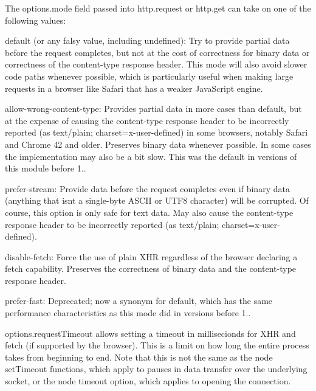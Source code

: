 \begin{DoxyItemize}
\item The {\ttfamily options.\+mode} field passed into {\ttfamily http.\+request} or {\ttfamily http.\+get} can take on one of the following values\+:
\begin{DoxyItemize}
\item \textquotesingle{}default\textquotesingle{} (or any falsy value, including {\ttfamily undefined})\+: Try to provide partial data before the request completes, but not at the cost of correctness for binary data or correctness of the \textquotesingle{}content-\/type\textquotesingle{} response header. This mode will also avoid slower code paths whenever possible, which is particularly useful when making large requests in a browser like Safari that has a weaker Java\+Script engine.
\item \textquotesingle{}allow-\/wrong-\/content-\/type\textquotesingle{}\+: Provides partial data in more cases than \textquotesingle{}default\textquotesingle{}, but at the expense of causing the \textquotesingle{}content-\/type\textquotesingle{} response header to be incorrectly reported (as \textquotesingle{}text/plain; charset=x-\/user-\/defined\textquotesingle{}) in some browsers, notably Safari and Chrome 42 and older. Preserves binary data whenever possible. In some cases the implementation may also be a bit slow. This was the default in versions of this module before 1..
\item \textquotesingle{}prefer-\/stream\textquotesingle{}\+: Provide data before the request completes even if binary data (anything that isn\textquotesingle{}t a single-\/byte A\+S\+C\+II or U\+T\+F8 character) will be corrupted. Of course, this option is only safe for text data. May also cause the \textquotesingle{}content-\/type\textquotesingle{} response header to be incorrectly reported (as \textquotesingle{}text/plain; charset=x-\/user-\/defined\textquotesingle{}).
\item \textquotesingle{}disable-\/fetch\textquotesingle{}\+: Force the use of plain X\+HR regardless of the browser declaring a fetch capability. Preserves the correctness of binary data and the \textquotesingle{}content-\/type\textquotesingle{} response header.
\item \textquotesingle{}prefer-\/fast\textquotesingle{}\+: Deprecated; now a synonym for \textquotesingle{}default\textquotesingle{}, which has the same performance characteristics as this mode did in versions before 1..
\end{DoxyItemize}
\item {\ttfamily options.\+request\+Timeout} allows setting a timeout in millisecionds for X\+HR and fetch (if supported by the browser). This is a limit on how long the entire process takes from beginning to end. Note that this is not the same as the node {\ttfamily set\+Timeout} functions, which apply to pauses in data transfer over the underlying socket, or the node {\ttfamily timeout} option, which applies to opening the connection.
\end{DoxyItemize}

